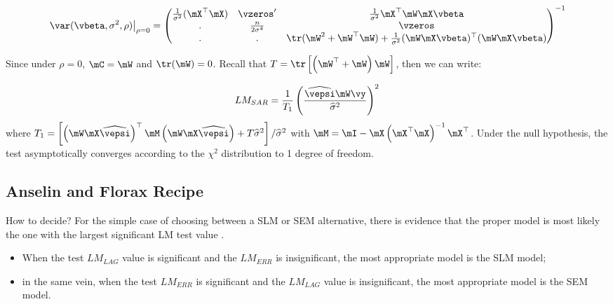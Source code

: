 \documentclass[english,12pt]{book}\usepackage[]{graphicx}\usepackage[]{xcolor}
\begin{document}
\begin{equation*}
	\left.\var(\vbeta, \sigma^2, \rho)\right|_{\rho = 0}= 
	\begin{pmatrix}
	\frac{1}{\sigma^2}(\mX^\top \mX) & \vzeros' & \frac{1}{\sigma^2} \mX^\top \mW\mX\vbeta \\
		. &  \frac{n}{2\sigma^4} & \vzeros \\
		. &  .& \tr(\mW^2 + \mW^\top\mW) + \frac{1}{\sigma^2}(\mW\mX\vbeta)^\top(\mW\mX\vbeta)
	\end{pmatrix} ^{-1}
\end{equation*}

Since under $\rho = 0$, $\mC =\mW$ and $\tr(\mW) = 0$. Recall that $T = \tr\left[\left(\mW^\top + \mW\right)\mW\right]$, then we can write:


\begin{equation}
LM_{SAR} = \frac{1}{T_1}\left(\frac{\widehat{\vepsi}\mW\vy}{\widehat{\sigma}^2}\right)^2
\end{equation}
%
where $T_1 = \left[\left(\mW\mX\widehat{\vepsi}\right)^\top\mM\left(\mW\mX\widehat{\vepsi}\right) + T\widehat{\sigma}^2\right]/\widehat{\sigma}^2$ with $\mM = \mI - \mX\left(\mX^\top\mX\right)^{-1}\mX^\top$. Under the null hypothesis, the test asymptotically converges according to the $\chi^2$ distribution to 1 degree of freedom. 

\subsection{Anselin and Florax Recipe}

How to decide? For the simple case of choosing between a SLM or SEM alternative, there is evidence that the proper model is most likely the one with the largest significant LM test value \citep{Anselin1991properties}.

\begin{itemize}
  \item When the test $LM_{LAG}$ value is significant and the $LM_{ERR}$ is insignificant, the most appropriate model is the SLM model;
  \item in the same vein, when the test  $LM_{ERR}$ is significant and the $LM_{LAG}$ value is insignificant, the most appropriate model is the SEM model.
\end{itemize}
\end{document}

